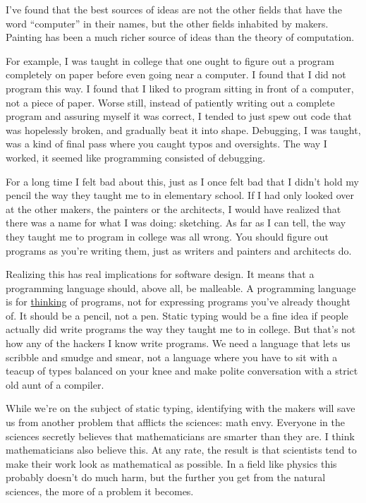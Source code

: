\documentclass[12pt]{book}
\begin{document}
I've found that the best sources of ideas are not the other fields that
have the word ``computer'' in their names, but the other fields
inhabited by makers. Painting has been a much richer source of ideas
than the theory of computation.

For example, I was taught in college that one ought to figure out a
program completely on paper before even going near a computer. I found
that I did not program this way. I found that I liked to program sitting
in front of a computer, not a piece of paper. Worse still, instead of
patiently writing out a complete program and assuring myself it was
correct, I tended to just spew out code that was hopelessly broken, and
gradually beat it into shape. Debugging, I was taught, was a kind of
final pass where you caught typos and oversights. The way I worked, it
seemed like programming consisted of debugging.

For a long time I felt bad about this, just as I once felt bad that I
didn't hold my pencil the way they taught me to in elementary school. If
I had only looked over at the other makers, the painters or the
architects, I would have realized that there was a name for what I was
doing: sketching. As far as I can tell, the way they taught me to
program in college was all wrong. You should figure out programs as
you're writing them, just as writers and painters and architects do.

Realizing this has real implications for software design. It means that
a programming language should, above all, be malleable. A programming
language is for \href{piraha.html}{thinking} of programs, not for
expressing programs you've already thought of. It should be a pencil,
not a pen. Static typing would be a fine idea if people actually did
write programs the way they taught me to in college. But that's not how
any of the hackers I know write programs. We need a language that lets
us scribble and smudge and smear, not a language where you have to sit
with a teacup of types balanced on your knee and make polite
conversation with a strict old aunt of a compiler.

While we're on the subject of static typing, identifying with the makers
will save us from another problem that afflicts the sciences: math envy.
Everyone in the sciences secretly believes that mathematicians are
smarter than they are. I think mathematicians also believe this. At any
rate, the result is that scientists tend to make their work look as
mathematical as possible. In a field like physics this probably doesn't
do much harm, but the further you get from the natural sciences, the
more of a problem it becomes.
\end{document}
